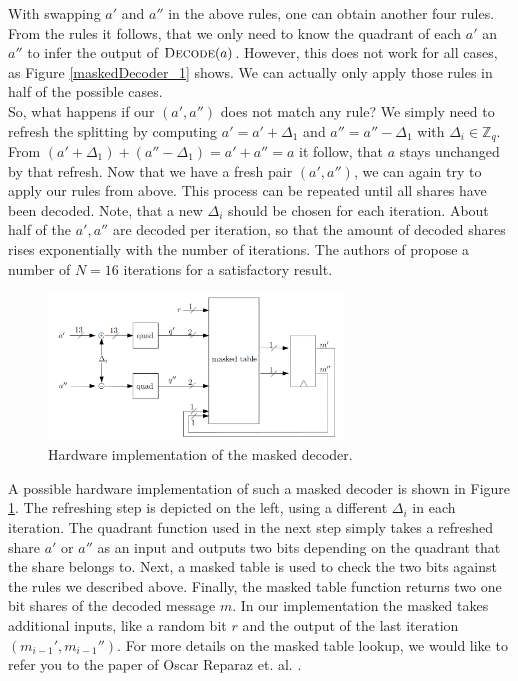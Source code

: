 With swapping \(a'\) and \(a''\) in the above rules, one can obtain another four rules. From the rules it follows, that we only need to know the quadrant of each \(a'\) an \(a''\) to infer the output of \(\textsc{Decode}(a)\). However, this does not work for all cases, as Figure \ref{maskedDecoder_1} shows. We can actually only apply those rules in half of the possible cases.\\
So, what happens if our \((a', a'')\) does not match any rule? We simply need to refresh the splitting by computing \(a' = a' + \Delta_1\) and \(a'' = a'' - \Delta_1\) with \(\Delta_i \in \mathbb{Z}_q\). From \((a' + \Delta_1) + (a'' - \Delta_1) = a' + a'' = a\) it follow, that \(a\) stays unchanged by that refresh. Now that we have a fresh pair \((a',a'')\), we can again try to apply our rules from above. This process can be repeated until all shares have been decoded. Note, that a new \(\Delta_i\) should be chosen for each iteration. About half of the \(a',a''\) are decoded per iteration, so that the amount of decoded shares rises exponentially with the number of iterations. The authors of \cite{maskedRing} propose a number of \(N = 16\) iterations for a satisfactory result.
\begin{figure}[H]
	\centering
	\includegraphics[width=0.7\textwidth]{maskedDecoder_2.png}
	\caption{Hardware implementation of the masked decoder. \cite{maskedRing}}
	\label{maskedDecoder_2}
\end{figure}
A possible hardware implementation of such a masked decoder is shown in Figure \ref{maskedDecoder_2}. The refreshing step is depicted on the left, using a different \(\Delta_i\) in each iteration. The quadrant function used in the next step simply takes a refreshed share \(a'\) or \(a''\) as an input and outputs two bits depending on the quadrant that the share belongs to. Next, a masked table is used to check the two bits against the rules we described above. Finally, the masked table function returns two one bit shares of the decoded message \(\textit{m}\). In our implementation the masked takes additional inputs, like a random bit \(r\) and the output of the last iteration \((m_{i-1}',m_{i-1}'')\). For more details on the masked table lookup, we would like to refer you to the paper of Oscar Reparaz et. al. \cite{maskedRing}.


